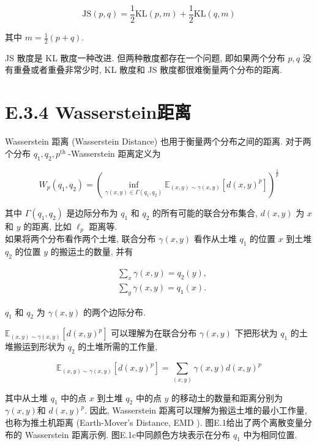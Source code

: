 \documentclass[10pt]{article}
\begin{document}
\begin{equation*}
\mathrm{JS}(p, q)=\frac{1}{2} \mathrm{KL}(p, m)+\frac{1}{2} \mathrm{KL}(q, m) \tag{E.16}
\end{equation*}


其中 $m=\frac{1}{2}(p+q)$.

JS 散度是 KL 散度一种改进. 但两种散度都存在一个问题, 即如果两个分布 $p, q$ 没有重叠或者重叠非常少时, $\mathrm{KL}$ 散度和 JS 散度都很难衡量两个分布的距离.

\section*{E.3.4 Wasserstein距离}
Wasserstein 距离 (Wasserstein Distance) 也用于衡量两个分布之间的距离. 对于两个分布 $q_{1}, q_{2}, p^{\text {th }}$-Wasserstein 距离定义为


\begin{equation*}
W_{p}\left(q_{1}, q_{2}\right)=\left(\inf _{\gamma(x, y) \in \Gamma\left(q_{1}, q_{2}\right)} \mathbb{E}_{(x, y) \sim \gamma(x, y)}\left[d(x, y)^{p}\right]\right)^{\frac{1}{p}} \tag{E.17}
\end{equation*}


其中 $\Gamma\left(q_{1}, q_{2}\right)$ 是边际分布为 $q_{1}$ 和 $q_{2}$ 的所有可能的联合分布集合, $d(x, y)$ 为 $x$ 和 $y$ 的距离, 比如 $\ell_{p}$ 距离等.\\
如果将两个分布看作两个土堆, 联合分布 $\gamma(x, y)$ 看作从土堆 $q_{1}$ 的位置 $x$ 到土堆 $q_{2}$ 的位置 $y$ 的搬运土的数量, 并有


\begin{align*}
& \sum_{x} \gamma(x, y)=q_{2}(y),  \tag{E.18}\\
& \sum_{y} \gamma(x, y)=q_{1}(x) . \tag{E.19}
\end{align*}


$q_{1}$ 和 $q_{2}$ 为 $\gamma(x, y)$ 的两个边际分布.

$\mathbb{E}_{(x, y) \sim \gamma(x, y)}\left[d(x, y)^{p}\right]$ 可以理解为在联合分布 $\gamma(x, y)$ 下把形状为 $q_{1}$ 的土堆搬运到形状为 $q_{2}$ 的土堆所需的工作量,


\begin{equation*}
\mathbb{E}_{(x, y) \sim \gamma(x, y)}\left[d(x, y)^{p}\right]=\sum_{(x, y)} \gamma(x, y) d(x, y)^{p} \tag{E.20}
\end{equation*}


其中从土堆 $q_{1}$ 中的点 $x$ 到土堆 $q_{2}$ 中的点 $y$ 的移动土的数量和距离分别为 $\gamma(x, y)$和 $d(x, y)^{p}$. 因此, Wasserstein 距离可以理解为搬运土堆的最小工作量, 也称为推土机距离 (Earth-Mover's Distance, EMD ). 图E.1给出了两个离散变量分布的 Wasserstein 距离示例. 图E.1c中同颜色方块表示在分布 $q_{1}$ 中为相同位置.
\end{document}
